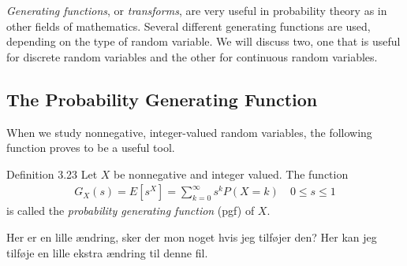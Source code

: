 \textit{Generating functions}, or \textit{transforms}, are very useful in probability theory as in other fields of mathematics. Several different generating functions are used, depending on the type of random variable. We will discuss two, one that is useful for discrete random variables and the other for continuous random variables.

\subsection{The Probability Generating Function}
When we study nonnegative, integer-valued random variables, the following function proves to be a useful tool.

\begin{boks}{Definition 3.23}
  Let $X$ be nonnegative and integer valued. The function
  \begin{align*}
    G_X(s) = E[s^X] = \sum_{k=0}^\infty s^kP(X=k) \quad 0 \leq s \leq 1
  \end{align*}
  is called the \textit{probability generating function} (pgf) of $X$.
\end{boks}

Her er en lille ændring, sker der mon noget hvis jeg tilføjer den? Her kan jeg tilføje en lille ekstra ændring til denne fil.
